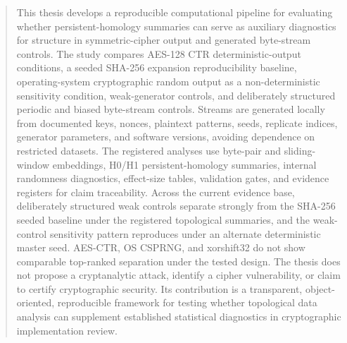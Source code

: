 
\begin{abstract}
This thesis develops a reproducible computational pipeline for evaluating whether persistent-homology summaries can serve as auxiliary diagnostics for structure in symmetric-cipher output and generated byte-stream controls. The study compares AES-128 CTR deterministic-output conditions, a seeded SHA-256 expansion reproducibility baseline, operating-system cryptographic random output as a non-deterministic sensitivity condition, weak-generator controls, and deliberately structured periodic and biased byte-stream controls. Streams are generated locally from documented keys, nonces, plaintext patterns, seeds, replicate indices, generator parameters, and software versions, avoiding dependence on restricted datasets. The registered analyses use byte-pair and sliding-window embeddings, H0/H1 persistent-homology summaries, internal randomness diagnostics, effect-size tables, validation gates, and evidence registers for claim traceability. Across the current evidence base, deliberately structured weak controls separate strongly from the SHA-256 seeded baseline under the registered topological summaries, and the weak-control sensitivity pattern reproduces under an alternate deterministic master seed. AES-CTR, OS CSPRNG, and xorshift32 do not show comparable top-ranked separation under the tested design. The thesis does not propose a cryptanalytic attack, identify a cipher vulnerability, or claim to certify cryptographic security. Its contribution is a transparent, object-oriented, reproducible framework for testing whether topological data analysis can supplement established statistical diagnostics in cryptographic implementation review.
\end{abstract}
